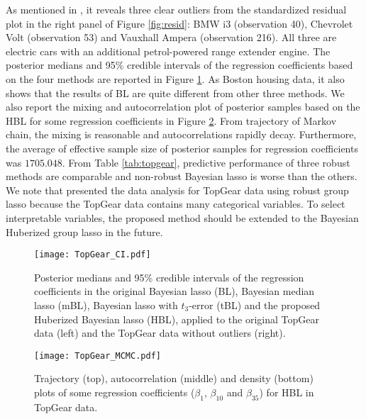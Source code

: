 \documentclass[11pt]{article}
\theoremstyle{plain}
\theoremstyle{definition}
\begin{document}
As mentioned in \cite{ACG16}, it reveals three clear outliers from the standardized residual plot in the right panel of Figure \ref{fig:resid}: BMW i3 (observation 40), Chevrolet Volt (observation 53) and Vauxhall Ampera (observation 216). All three are electric cars with an additional petrol-powered range extender engine. The posterior medians and 95\% credible intervals of the regression coefficients based on the four methods are reported in Figure \ref{fig:topgear_CI}. As Boston housing data, it also shows that the results of BL are quite different from other three methods. We also report the mixing and autocorrelation plot of posterior samples based on the HBL for some regression coefficients in Figure \ref{fig:topgear_MCMC}. From trajectory of Markov chain, the mixing is reasonable and autocorrelations rapidly decay. Furthermore, the average of effective sample size of posterior samples for regression coefficients was $1705.048$. From Table \ref{tab:topgear}, predictive performance of three robust methods are comparable and non-robust Bayesian lasso is worse than the others. We note that \cite{ACG16} presented the data analysis for TopGear data using robust group lasso because the TopGear data contains many categorical variables. To select interpretable variables, the proposed method should be extended to the Bayesian Huberized group lasso in the future.



\begin{figure}[htbp]
\centering
\texttt{[image: TopGear\_CI.pdf]}
\caption{Posterior medians and 95\% credible intervals of the regression coefficients in the original Bayesian lasso (BL), Bayesian median lasso (mBL), Bayesian lasso with $t_3$-error (tBL) and the proposed Huberized Bayesian lasso (HBL), applied to the original TopGear data (left) and the TopGear data without outliers (right).}
\label{fig:topgear_CI}
\end{figure}

\begin{figure}[htbp]
\centering
\texttt{[image: TopGear\_MCMC.pdf]}
\caption{Trajectory (top), autocorrelation (middle) and density (bottom) plots of some regression coefficients ($\beta_1$, $\beta_{10}$ and $\beta_{35}$) for HBL in TopGear data.}
\label{fig:topgear_MCMC}
\end{figure}
\end{document}
